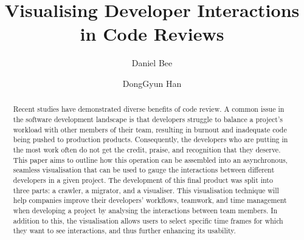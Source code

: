 \documentclass[sigconf]{acmart}
\begin{document}
\title{Visualising Developer Interactions in Code Reviews}

\author{Daniel Bee}

\author{DongGyun Han}


\renewcommand{\shortauthors}{Bee et al.}

\begin{abstract}
    Recent studies have demonstrated diverse benefits of code review.
    A common issue in the software development landscape is
    that developers struggle to balance a project's workload with other members of their team,
    resulting in burnout and inadequate code being pushed to production products.
    Consequently, the developers who are putting in the most work often do not get the credit,
    praise, and recognition that they deserve.
    This paper aims to outline how this operation can be assembled into an asynchronous,
    seamless visualisation that can be used to gauge the interactions between different developers in a given project.
    The development of this final product was split into three parts: a crawler, a migrator, and a visualiser.
    This visualisation technique will help companies improve their developers' workflows,
    teamwork, and time management when developing a project by analysing the interactions between team members.
    In addition to this,
    the visualisation allows users to select specific time frames for which they want to see interactions,
    and thus further enhancing its usability.
\end{abstract}
\end{document}
